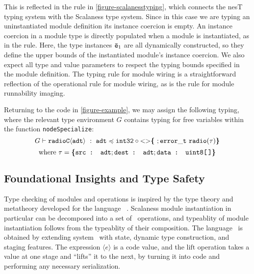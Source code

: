 This is reflected in the  rule in
\autoref{figure-scalanesstyping}, which connects the nesT typing
system with the Scalaness type system. Since in this case we are
typing an uninstantiated module definition its instance coercion is
empty.  An instance coercion in a module type is directly populated
when a module is instantiated, as in the  rule.
Here, the type instances ${\mathtt{\bar{e}}}_1$ are all dynamically
constructed, so they define the upper bounds of the instantiated
module's instance coercion. We also expect all type and value
parameters to respect the typing bounds specified in the module
definition. 
The  typing rule for module wiring is a
straightforward reflection of the operational rule for module wiring,
as is the  rule for module runnability
imaging.
\begin{example}
\label{example-scalanesstyping}
Returning to the code in \autoref{figure-example}, we may assign the
following typing, where the relevant type environment $G$ contains 
typing for free variables within the function \texttt{nodeSpecialize}:
$$
  G \vdash \mathtt{radioC\langle adt \rangle}\ :\  
    \texttt{adt} \preccurlyeq \texttt{int32} \circ \mathrm{<}\mathrm{>}\textup{\textbf{\{}}\ ;
      \mathtt{error\_t\ radio(\tau)} \textup{\textbf{\}}}
$$
$$
\text{where}\ \tau = \textup{\textbf{\{}} \texttt{src : adt}; \texttt{dest : adt}; \texttt{data : uint8[\,]} \textup{\textbf{\}}} 
$$
\end{example}

\subsection{Foundational Insights and Type Safety} 
\label{section-framedml}

Type checking of modules and operations is inspired by the type theory
and metatheory developed for the language \fml\ \cite{FramedML}. Scalaness
module instantiation in particular can be decomposed into a set of
\fml\ operations, and typeablity of module instantiation follows from
the typeablity of their composition. The language \fml\ is obtained by
extending system \fsub\ with state, dynamic type construction, and
staging features. The expression $\langle e \rangle$ is a code value,
and the $\mathrm{lift}$ operation takes a value at one stage
and ``lifts'' it to the next, by turning it into code and performing
any necessary serialization.

